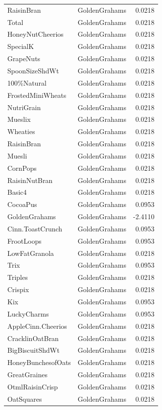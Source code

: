 \begin{longtable}{llr}
RaisinBran & GoldenGrahams & 0.0218 \\
Total & GoldenGrahams & 0.0218 \\
HoneyNutCheerios & GoldenGrahams & 0.0218 \\
SpecialK & GoldenGrahams & 0.0218 \\
GrapeNuts & GoldenGrahams & 0.0218 \\
SpoonSizeShdWt & GoldenGrahams & 0.0218 \\
100\%Natural & GoldenGrahams & 0.0218 \\
FrostedMiniWheats & GoldenGrahams & 0.0218 \\
NutriGrain & GoldenGrahams & 0.0218 \\
Mueslix & GoldenGrahams & 0.0218 \\
Wheaties & GoldenGrahams & 0.0218 \\
RaisinBran & GoldenGrahams & 0.0218 \\
Muesli & GoldenGrahams & 0.0218 \\
CornPops & GoldenGrahams & 0.0218 \\
RaisinNutBran & GoldenGrahams & 0.0218 \\
Basic4 & GoldenGrahams & 0.0218 \\
CocoaPus & GoldenGrahams & 0.0953 \\
GoldenGrahams & GoldenGrahams & -2.4110 \\
Cinn.ToastCrunch & GoldenGrahams & 0.0953 \\
FrootLoops & GoldenGrahams & 0.0953 \\
LowFatGranola & GoldenGrahams & 0.0218 \\
Trix & GoldenGrahams & 0.0953 \\
Triples & GoldenGrahams & 0.0218 \\
Crispix & GoldenGrahams & 0.0218 \\
Kix & GoldenGrahams & 0.0953 \\
LuckyCharms & GoldenGrahams & 0.0953 \\
AppleCinn.Cheerios & GoldenGrahams & 0.0218 \\
CracklinOatBran & GoldenGrahams & 0.0218 \\
BigBiscuitShdWt & GoldenGrahams & 0.0218 \\
HoneyBunchesofOats & GoldenGrahams & 0.0218 \\
GreatGraines & GoldenGrahams & 0.0218 \\
OtmlRaisinCrisp & GoldenGrahams & 0.0218 \\
OatSquares & GoldenGrahams & 0.0218 \\

\end{longtable}
